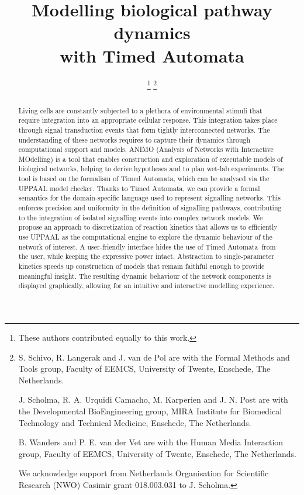 \documentclass[journal, 10pt]{IEEEtran}
\def\tas{Timed Automata}
\begin{document}
\title{Modelling biological pathway dynamics\\with \tas}


\author{
%
\thanks{These authors contributed equally to this work.}%
\thanks{S. Schivo, R. Langerak and J. van de Pol are with the Formal Methods and Tools group,
Faculty of EEMCS, University of Twente, Enschede, The Netherlands.

J. Scholma, R. A. Urquidi Camacho, M. Karperien and J. N. Post are with the Developmental BioEngineering group,
MIRA Institute for Biomedical Technology and Technical Medicine, Enschede, The Netherlands.

B. Wanders and P. E. van der Vet are with the Human Media Interaction group,
Faculty of EEMCS, University of Twente, Enschede, The Netherlands.

We acknowledge support from Netherlands Organisation for Scientific Research (NWO) Casimir grant 018.003.031 to J. Scholma.}%
}

\maketitle


\begin{abstract}
Living cells are constantly subjected to a plethora of environmental stimuli that require integration into an appropriate cellular response. 
This integration takes place through signal transduction events that form tightly interconnected networks. The understanding of these networks requires
to capture their dynamics through computational support and models.
ANIMO (Analysis of Networks with Interactive MOdelling) is a tool that enables construction and exploration of executable models 
of biological networks, helping to derive hypotheses and to plan wet-lab experiments.
The tool is based on the formalism of \tas, which can be analysed via
the UPPAAL model checker.
Thanks to \tas, we can provide a formal semantics for the domain-specific language used to represent signalling networks.
This enforces precision and uniformity in the definition of signalling pathways,
contributing to the integration of isolated signalling events into complex network models.
We propose an approach to discretization of reaction kinetics that allows us to efficiently use UPPAAL
as the computational engine to explore the dynamic behaviour of the network of interest.
A user-friendly interface hides the use of \tas\ from the user, while keeping the expressive power intact. 
Abstraction to single-parameter kinetics speeds up construction of models
that remain faithful enough to provide meaningful insight. The resulting dynamic behaviour of the network components 
is displayed graphically, allowing for an intuitive and interactive modelling experience.
\end{abstract}
\end{document}
